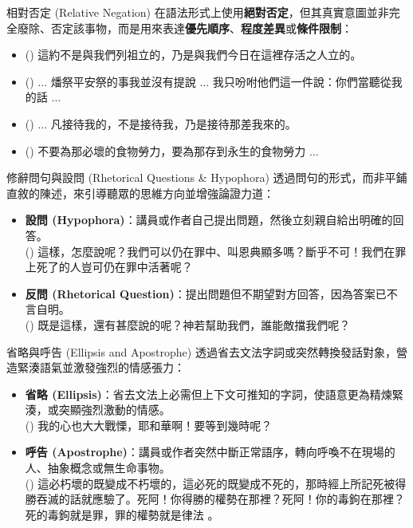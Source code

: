 \documentclass{beamer}
\begin{document}
\begin{frame}{相對否定 (Relative Negation)}
  在語法形式上使用\textbf{絕對否定}，但其真實意圖並非完全廢除、否定該事物，而是用來表達\textbf{優先順序}、\textbf{程度差異}或\textbf{條件限制}\parencite{Berakhot12b13a}：
  \begin{itemize}
    \item () 這約不是與我們列祖立的，乃是與我們今日在這裡存活之人立的。
    \item () $\dots$ 燔祭平安祭的事我並沒有提說 $\dots$ 我只吩咐他們這一件說：你們當聽從我的話 $\dots$
    \item () $\dots$ 凡接待我的，不是接待我，乃是接待那差我來的。
    \item () 不要為那必壞的食物勞力，要為那存到永生的食物勞力 $\dots$
  \end{itemize}
\end{frame}

\begin{frame}{修辭問句與設問 (Rhetorical Questions \& Hypophora)}
  透過問句的形式，而非平鋪直敘的陳述，來引導聽眾的思維方向並增強論證力道：
  \begin{itemize}
    \item\textbf{設問 (Hypophora)}：講員或作者自己提出問題，然後立刻親自給出明確的回答。\\
      () 這樣，怎麼說呢？我們可以仍在罪中、叫恩典顯多嗎？斷乎不可！我們在罪上死了的人豈可仍在罪中活著呢？
    \item\textbf{反問 (Rhetorical Question)}：提出問題但不期望對方回答，因為答案已不言自明。\\
      () 既是這樣，還有甚麼說的呢？神若幫助我們，誰能敵擋我們呢？
  \end{itemize}
\end{frame}

\begin{frame}{省略與呼告 (Ellipsis and Apostrophe)}
  透過省去文法字詞或突然轉換發話對象，營造緊湊語氣並激發強烈的情感張力：
  \begin{itemize}
    \item\textbf{省略 (Ellipsis)}：省去文法上必需但上下文可推知的字詞，使語意更為精煉緊湊，或突顯強烈激動的情感。\\
      () 我的心也大大戰慄，耶和華啊！要等到幾時呢？
    \item\textbf{呼告 (Apostrophe)}：講員或作者突然中斷正常語序，轉向呼喚不在現場的人、抽象概念或無生命事物。\\
      () 這必朽壞的既變成不朽壞的，這必死的既變成不死的，那時經上所記死被得勝吞滅的話就應驗了。死阿！你得勝的權勢在那裡？死阿！你的毒鉤在那裡？死的毒鉤就是罪，罪的權勢就是律法 。
  \end{itemize}
\end{frame}
\end{document}
